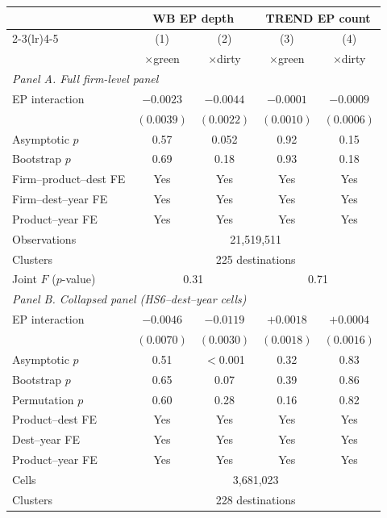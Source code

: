 \small
\begin{threeparttable}
\begin{tabular}{lcccc}
\toprule
 & \multicolumn{2}{c}{WB EP depth} & \multicolumn{2}{c}{TREND EP count} \\
\cmidrule(lr){2-3}\cmidrule(lr){4-5}
 & (1) & (2) & (3) & (4) \\
 & $\times$green & $\times$dirty & $\times$green & $\times$dirty \\
\midrule
\multicolumn{5}{l}{\textit{Panel A. Full firm-level panel}} \\
\addlinespace
EP interaction & $-0.0023$ & $-0.0044$ & $-0.0001$ & $-0.0009$ \\
 & $(0.0039)$ & $(0.0022)$ & $(0.0010)$ & $(0.0006)$ \\
\quad Asymptotic $p$ & 0.57 & 0.052 & 0.92 & 0.15 \\
\quad Bootstrap $p$ & 0.69 & 0.18 & 0.93 & 0.18 \\
\addlinespace
Firm--product--dest FE & Yes & Yes & Yes & Yes \\
Firm--dest--year FE & Yes & Yes & Yes & Yes \\
Product--year FE & Yes & Yes & Yes & Yes \\
Observations & \multicolumn{4}{c}{21,519,511} \\
Clusters & \multicolumn{4}{c}{225 destinations} \\
Joint $F$ ($p$-value) & \multicolumn{2}{c}{0.31} & \multicolumn{2}{c}{0.71} \\
\midrule
\multicolumn{5}{l}{\textit{Panel B. Collapsed panel (HS6--dest--year cells)}} \\
\addlinespace
EP interaction & $-0.0046$ & $-0.0119$\sym{***} & $+0.0018$ & $+0.0004$ \\
 & $(0.0070)$ & $(0.0030)$ & $(0.0018)$ & $(0.0016)$ \\
\quad Asymptotic $p$ & 0.51 & $<$0.001 & 0.32 & 0.83 \\
\quad Bootstrap $p$ & 0.65 & 0.07 & 0.39 & 0.86 \\
\quad Permutation $p$ & 0.60 & 0.28 & 0.16 & 0.82 \\
\addlinespace
Product--dest FE & Yes & Yes & Yes & Yes \\
Dest--year FE & Yes & Yes & Yes & Yes \\
Product--year FE & Yes & Yes & Yes & Yes \\
Cells & \multicolumn{4}{c}{3,681,023} \\
Clusters & \multicolumn{4}{c}{228 destinations} \\

\end{tabular}
\end{threeparttable}
